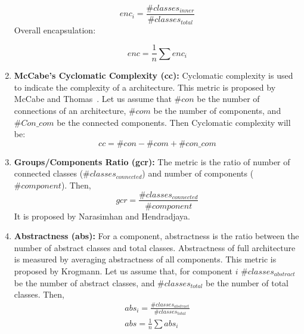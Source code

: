 \documentclass[letterpaper, 10 pt, conference]{ieeeconf}  %
\begin{document}
\begin{enumerate}
 \begin{displaymath}
enc_{i}=\frac{\#classes_{inner}}{\#classes_{total}} 
 \end{displaymath}
Overall encapsulation:

\begin{equation} \label{enc_eq}
enc=\frac{1}{n}\sum{enc_{i}}
\end{equation}



\item \textbf{ McCabe's Cyclomatic Complexity (cc):} Cyclomatic complexity is  used to indicate the complexity of a architecture. This metric is proposed by McCabe and Thomas~\cite{mccabe1976complexity}. Let us assume that  $\#con$ be the number of connections of  an architecture, $\#com$ be the number of components, and  $\#Con\_com$ be the connected components. Then Cyclomatic complexity will be:
\begin{equation}\label{cc_eq}
cc=\#con - \#com + \#con\_com 
\end{equation}

\item \textbf{Groups/Components Ratio (gcr):}
The metric is the ratio of number of connected classes ($\#classes_{connected}$) and number of components ($\#component$). Then,
\begin{equation}
gcr=\frac{\#classes_{connected}}{\#component}
\end{equation}
It is proposed by  Narasimhan and Hendradjaya\cite{narasimhan2007some}.

\item \textbf{Abstractness (abs): }For a component, abstractness is the ratio between the number of abstract classes and total classes. Abstractness of full architecture is measured by averaging abstractness of all components. This metric is proposed by Krogmann\cite{krogmann2012reconstruction}. Let us assume that, for component $i$ $\#classes_{abstract}$ be the number of abstract classes, and $\#classes_{total}$ be the number of total classes. Then,
\begin{equation}\label{abs_eq}
 \begin{array}{l}
abs_{i}=\frac{\#classes_{abstract}}{\#classes_{total}} \\
abs=\frac{1}{n}\sum{abs_{i}}
\end{array}
\end{equation}








\end{enumerate}
\end{document}
